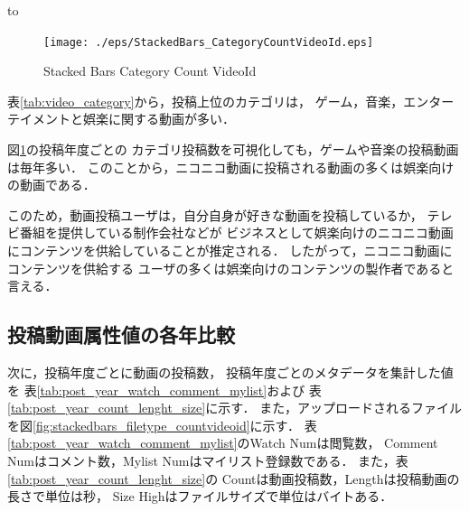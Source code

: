 \documentclass[submit,techrep,noauthor]{ipsj}
\begin{document}
\begin{table}[h]
\caption{カテゴリ別 投稿動画件数}
\label{tab:video_category}
\hbox to
\end{table}

\begin{figure}[h]
    \texttt{[image: ./eps/StackedBars\_CategoryCountVideoId.eps]}
  \caption{Stacked Bars Category Count VideoId}
  \label{fig:stackedbars_categorycountvideoId}
\end{figure}

表\ref{tab:video_category}から，投稿上位のカテゴリは，
ゲーム，音楽，エンターテイメントと娯楽に関する動画が多い．

図\ref{fig:stackedbars_categorycountvideoId}の投稿年度ごとの
カテゴリ投稿数を可視化しても，ゲームや音楽の投稿動画は毎年多い．
このことから，ニコニコ動画に投稿される動画の多くは娯楽向けの動画である．

このため，動画投稿ユーザは，自分自身が好きな動画を投稿しているか，
テレビ番組を提供している制作会社などが
ビジネスとして娯楽向けのニコニコ動画にコンテンツを供給していることが推定される．
%
したがって，ニコニコ動画にコンテンツを供給する
ユーザの多くは娯楽向けのコンテンツの製作者であると言える．

\subsection{投稿動画属性値の各年比較}\label{simulation}
次に，投稿年度ごとに動画の投稿数，
投稿年度ごとのメタデータを集計した値を
表\ref{tab:post_year_watch_comment_mylist}および
表\ref{tab:post_year_count_lenght_size}に示す．
また，アップロードされるファイルを図\ref{fig:stackedbars_filetype_countvideoid}に示す．
%
表\ref{tab:post_year_watch_comment_mylist}のWatch Numは閲覧数，
Comment Numはコメント数，Mylist Numはマイリスト登録数である．
%
また，表\ref{tab:post_year_count_lenght_size}の
Countは動画投稿数，Lengthは投稿動画の長さで単位は秒，
Size Highはファイルサイズで単位はバイトある．
\end{document}
